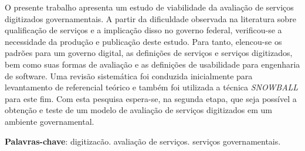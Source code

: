 \begin{resumo}

O presente trabalho apresenta um estudo de viabilidade da avaliação de serviços digitizados governamentais. A partir da dificuldade observada na literatura sobre qualificação de serviços e a implicação disso no governo federal, verificou-se a necessidade da produção e publicação deste estudo. Para tanto, elencou-se os padrões para um governo digital, as definições de serviços e serviços digitizados, bem como suas formas de avaliação e as definições de usabilidade para engenharia de software. Uma revisão sistemática foi conduzida inicialmente para levantamento de referencial teórico e também foi utilizada a técnica \textit{SNOWBALL} para este fim. Com esta pesquisa espera-se, na segunda etapa, que seja possível a obtenção e teste de um modelo de avaliação de serviços digitizados em um ambiente governamental. 

 \vspace{\onelineskip}
    
 \noindent
 \textbf{Palavras-chave}: digitizacão. avaliação de serviços. serviços governamentais.
\end{resumo}
